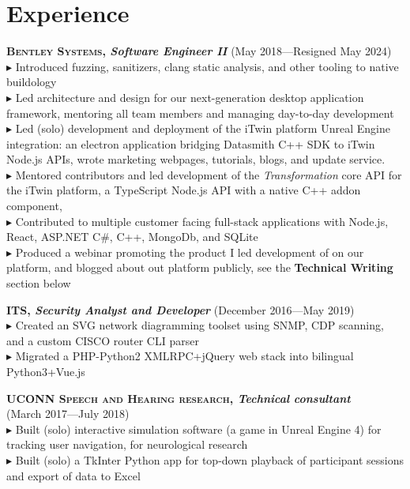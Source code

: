 \documentclass[Letterpaper,11pt]{article}
\newcommand\bul{$\blacktriangleright$ }
\begin{document}
\section*{Experience}
    \textbf{\textsc{Bentley Systems}, \textit{Software Engineer II}} (May 2018---Resigned May 2024)\\
        \bul Introduced fuzzing, sanitizers, clang static analysis, and other tooling to native buildology
        \\
        \bul Led architecture and design for our next-generation desktop application framework, mentoring all team members and managing day-to-day development
        \\
        \bul Led (solo) development and deployment of the iTwin platform Unreal Engine integration: an electron application bridging Datasmith C++ SDK to iTwin Node.js APIs,
            wrote marketing webpages, tutorials, blogs, and update service.
        \\
        \bul Mentored contributors and led development of the \textit{Transformation} core API for the iTwin platform, a TypeScript Node.js API with a native C++ addon component,
        \\
        \bul Contributed to multiple customer facing full-stack applications with Node.js, React, ASP.NET C\#, C++, MongoDb, and SQLite
        \\
        \bul Produced a webinar promoting the product I led development of on our platform, and blogged about out platform publicly, see the \textbf{Technical Writing} section below

    \textbf{\textsc{ITS}, \textit{Security Analyst and Developer}} (December 2016---May 2019)\\
        \bul Created an SVG network diagramming toolset using SNMP, CDP scanning,
        and a custom CISCO router CLI parser
        \\
        \bul Migrated a PHP-Python2 XMLRPC+jQuery web stack into bilingual Python3+Vue.js

    \textbf{\textsc{UCONN Speech and Hearing research}, \textit{Technical consultant}}\\
    (March 2017---July 2018)\\
        \bul Built (solo) interactive simulation software (a game in Unreal Engine 4)
        for tracking user navigation, for neurological research
        \\
        \bul Built (solo) a TkInter Python app for top-down playback of participant sessions and export of data to Excel
        
\end{document}
